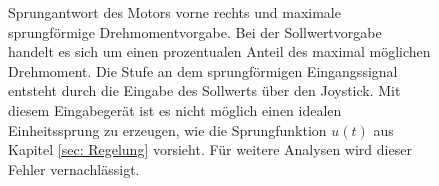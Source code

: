 %			

\begin{figure}[H]
	\centering
	\caption{Sprungantwort des Motors vorne rechts und maximale  sprungförmige Drehmomentvorgabe. Bei der Sollwertvorgabe handelt es sich um einen prozentualen Anteil des maximal möglichen Drehmoment. Die Stufe an dem sprungförmigen Eingangssignal entsteht durch die Eingabe des Sollwerts über den Joystick. Mit diesem Eingabegerät ist es nicht möglich einen idealen Einheitssprung zu erzeugen, wie die Sprungfunktion $u(t)$ aus Kapitel \ref{sec: Regelung} vorsieht. Für weitere Analysen wird dieser Fehler vernachlässigt.}
	\label{fig: brr}
\end{figure}
